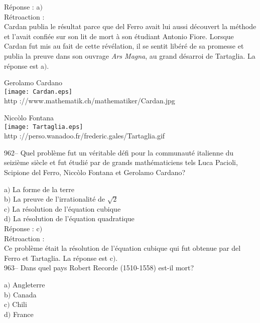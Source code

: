 ﻿\documentclass[letterpaper, 12pt]{article}
\begin{document}
R\'eponse : a$)$\\

R\'etroaction : \\
Cardan publia le r\'esultat parce que del Ferro avait lui aussi
d\'ecouvert la m\'ethode et l'avait confi\'ee sur son lit de mort
\`a son \'etudiant Antonio Fiore. Lorsque Cardan fut mis au fait de
cette r\'ev\'elation, il se sentit lib\'er\'e de sa promesse et
publia la preuve dans son ouvrage
{\sl Ars Magna}, au grand d\'esarroi de Tartaglia. La r\'eponse est a$)$.\\

        \begin{center}
        Gerolamo Cardano\\
    \texttt{[image: Cardan.eps]}\\
        {\footnotesize http ://www.mathematik.ch/mathematiker/Cardan.jpg}
    \end{center}

        \begin{center}
        Nicc\`olo Fontana\\
    \texttt{[image: Tartaglia.eps]}\\
        {\footnotesize http
://perso.wanadoo.fr/frederic.gales/Tartaglia.gif}
    \end{center}

962-- Quel probl\`eme fut un v\'eritable d\'efi pour la communaut\'e
italienne du seizi\`eme si\`ecle et fut \'etudi\'e par de grands
math\'ematiciens tels Luca Pacioli, Scipione del Ferro, Nicc\`olo
Fontana et Gerolamo Cardano?

a$)$ La forme de la terre \\
b$)$ La preuve de l'irrationalit\'e de $\sqrt2$ \\
c$)$ La r\'esolution de l'\'equation cubique  \\
d$)$ La r\'esolution de l'\'equation quadratique \\

R\'eponse : c$)$\\

R\'etroaction : \\
Ce probl\`eme \'etait la r\'esolution de l'\'equation cubique qui
fut obtenue
par del Ferro et Tartaglia. La r\'eponse est c$)$.\\

963-- Dans quel pays Robert Recorde (1510-1558) est-il mort?

a$)$ Angleterre \\
b$)$ Canada  \\
c$)$ Chili \\
d$)$ France\\
\end{document}
